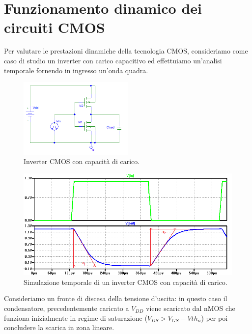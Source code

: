\section{Funzionamento dinamico dei circuiti CMOS}

Per valutare le prestazioni dinamiche della tecnologia CMOS, consideriamo come caso di studio un inverter con carico capacitivo ed effettuiamo un'analisi temporale fornendo in ingresso un'onda quadra.

\begin{figure}[hbt!]
	\centering
	\includegraphics[width=0.5\textwidth]{figure/Sch_InverterCMOS.PNG}
	\caption{Inverter CMOS con capacità di carico.}
	\label{fig:fig_sch_inverterCMOS}
\end{figure}

\begin{figure}[hbt!]
	\centering
	\includegraphics[width=1\textwidth]{figure/Sim_InverterCMOS(chiaro)WithNotes.png}
	\caption{Simulazione temporale di un inverter CMOS con capacità di carico.}
	\label{fig:fig_sim_inverterCMOS}
\end{figure}

Consideriamo un fronte di discesa della tensione d'uscita: in questo caso il condensatore, precedentemente caricato a $V_{DD}$ viene scaricato dal nMOS che funziona inizialmente in regime di saturazione ($V_{DS}>V_{GS}-V{th_n}$) per poi concludere la scarica in zona lineare. 

